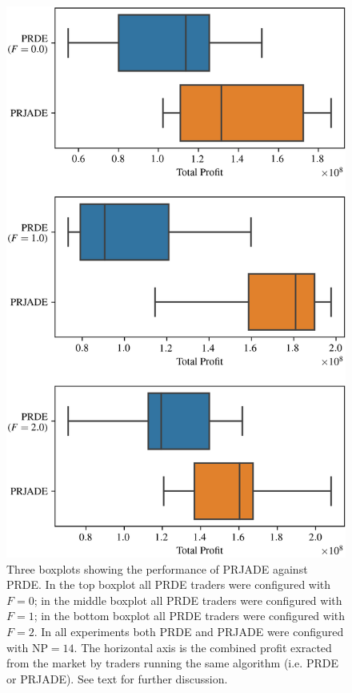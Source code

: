 \documentclass[conference]{IEEEtran}
\begin{document}
\begin{figure}[htbp]
    \centerline{\includegraphics[width=\columnwidth]{prjade_prde_boxplot.png}}
    \caption{
        Three boxplots showing the performance of PRJADE against PRDE.
        In the top boxplot all PRDE traders were configured with $F=0$; in the middle boxplot all PRDE traders were configured with $F=1$; in the bottom boxplot all PRDE traders were configured with $F=2$.
        In all experiments both PRDE and PRJADE were configured with $\mathrm{NP}=14$.
        The horizontal axis is the combined profit exracted from the market by traders running the same algorithm (i.e. PRDE or PRJADE).
        See text for further discussion.
    }
    \label{prjade_prde_boxplot}
\end{figure}
\end{document}
